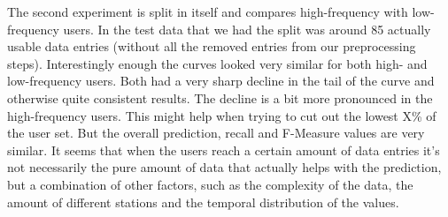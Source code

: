 The second experiment is split in itself and compares high-frequency with low-frequency users. In the test data that we had the split was around 85 actually usable data entries (without all the removed entries from our preprocessing steps). Interestingly enough the curves looked very similar for both high- and low-frequency users. Both had a very sharp decline in the tail of the curve and otherwise quite consistent results. The decline is a bit more pronounced in the high-frequency users. This might help when trying to cut out the lowest X\% of the user set. But the overall prediction, recall and F-Measure values are very similar. It seems that when the users reach a certain amount of data entries it's not necessarily the pure amount of data that actually helps with the prediction, but a combination of other factors, such as the complexity of the data, the amount of different stations and the temporal distribution of the values.